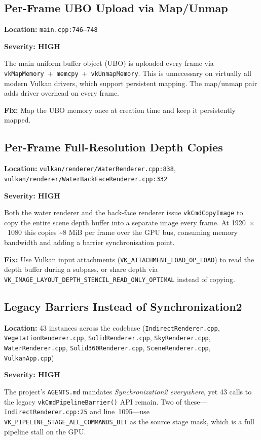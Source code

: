 \documentclass[a4paper,11pt]{article}
\begin{document}
\subsection{Per-Frame UBO Upload via Map/Unmap}

\textbf{Location:} \texttt{main.cpp:746--748}

\textbf{Severity: HIGH}

The main uniform buffer object (UBO) is uploaded every frame via
\texttt{vkMapMemory}~+~\texttt{memcpy}~+~\texttt{vkUnmapMemory}. This is
unnecessary on virtually all modern Vulkan drivers, which support persistent
mapping. The map/unmap pair adds driver overhead on every frame.

\textbf{Fix:} Map the UBO memory once at creation time and keep it
persistently mapped.

\subsection{Per-Frame Full-Resolution Depth Copies}

\textbf{Location:}
\texttt{vulkan/renderer/WaterRenderer.cpp:838},
\texttt{vulkan/renderer/WaterBackFaceRenderer.cpp:332}

\textbf{Severity: HIGH}

Both the water renderer and the back-face renderer issue
\texttt{vkCmdCopyImage} to copy the entire scene depth buffer into a
separate image every frame. At 1920~$\times$~1080 this copies \textasciitilde8
MiB per frame over the GPU bus, consuming memory bandwidth and adding a
barrier synchronisation point.

\textbf{Fix:} Use Vulkan input attachments (\texttt{VK\_ATTACHMENT\_LOAD\_OP\_LOAD})
to read the depth buffer during a subpass, or share depth via
\texttt{VK\_IMAGE\_LAYOUT\_DEPTH\_STENCIL\_READ\_ONLY\_OPTIMAL} instead of
copying.

\subsection{Legacy Barriers Instead of Synchronization2}

\textbf{Location:} 43 instances across the codebase
(\texttt{IndirectRenderer.cpp}, \texttt{VegetationRenderer.cpp},
\texttt{SolidRenderer.cpp}, \texttt{SkyRenderer.cpp},
\texttt{WaterRenderer.cpp}, \texttt{Solid360Renderer.cpp},
\texttt{SceneRenderer.cpp}, \texttt{VulkanApp.cpp})

\textbf{Severity: HIGH}

The project's \texttt{AGENTS.md} mandates {\itshape Synchronization2
everywhere}, yet 43 calls to the legacy \texttt{vkCmdPipelineBarrier()} API
remain. Two of these---
\texttt{IndirectRenderer.cpp:25} and line~1095---use
\texttt{VK\_PIPELINE\_STAGE\_ALL\_COMMANDS\_BIT} as the source stage mask,
which is a full pipeline stall on the GPU.
\end{document}
